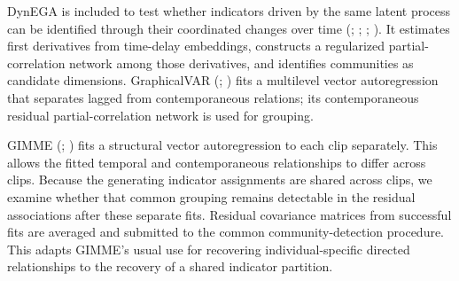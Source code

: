 \documentclass[
]{article}
\begin{document}
\begin{table}[H]

\caption{\label{tbl-method-roles}The four Study 2 methods, the structure
each supplies for the common grouping step, and its purpose in the
recovery comparison.}


\end{table}%

DynEGA is included to test whether indicators driven by the same latent
process can be identified through their coordinated changes over time
(;
;
;
). It
estimates first derivatives from time-delay embeddings, constructs a
regularized partial-correlation network among those derivatives, and
identifies communities as candidate dimensions. GraphicalVAR
(;
) fits a multilevel vector
autoregression that separates lagged from contemporaneous relations; its
contemporaneous residual partial-correlation network is used for
grouping.

GIMME (;
) fits a structural
vector autoregression to each clip separately. This allows the fitted
temporal and contemporaneous relationships to differ across clips.
Because the generating indicator assignments are shared across clips, we
examine whether that common grouping remains detectable in the residual
associations after these separate fits. Residual covariance matrices
from successful fits are averaged and submitted to the common
community-detection procedure. This adapts GIMME's usual use for
recovering individual-specific directed relationships to the recovery of
a shared indicator partition.
\end{document}
